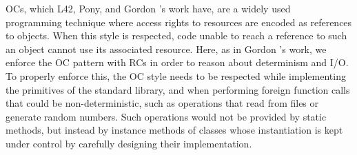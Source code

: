





% 





OCs, which L42, Pony, and Gordon \etal's work have, are a widely used~\cite{miller2003capability,noble2016abstract,karger1988improving} programming technique where access rights to resources are encoded as references to objects. When this style
is respected, 
code 
unable to reach a reference
 to such an object cannot use its associated resource.
Here, as in Gordon \etal's work, we enforce the OC pattern with RCs in order to reason about determinism and I/O. To properly enforce this, the OC style needs to be respected while implementing the primitives of the standard library, and when performing foreign function calls that could be non-deterministic, such as operations that read from files or generate random numbers. Such operations would not be provided by static methods, but instead by instance methods of classes whose instantiation is kept under control
by carefully designing their implementation. 


